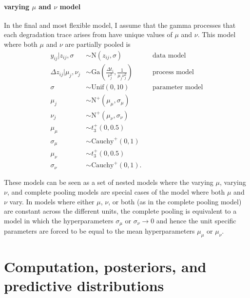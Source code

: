 \paragraph{varying $\mu$ and $\nu$ model} In the final and most flexible model, I assume that the gamma processes that each degradation trace arises from have unique values of $\mu$ and $\nu$. This model where both $\mu$ and $\nu$ are partially pooled is
\begin{align*} 
   y_{ij}|z_{ij}, \sigma & \sim \mbox{N}(z_{ij}, \sigma)  && \mbox{data model} \\
   \Delta z_{ij}|\mu_j, \nu_j & \sim \mbox{Ga} \left( \frac{\Delta t_{i}}{\nu_j^2}, \frac{1}{\mu_j \nu_j^2} \right) && \mbox{process model} \\
   \sigma & \sim \mbox{Unif}(0, 10) && \mbox{parameter model} \\
   \mu_j & \sim \mbox{N}^{+}(\mu_{\mu}, \sigma_{\mu}) \\
   \nu_j & \sim \mbox{N}^{+}(\mu_{\nu}, \sigma_{\nu}) \\
   \mu_{\mu} & \sim t^{+}_3(0, 0.5) \\
   \sigma_{\mu} & \sim \mbox{Cauchy}^{+}(0, 1) \\
   \mu_{\nu} & \sim t^{+}_3(0, 0.5) \\
   \sigma_{\nu} & \sim \mbox{Cauchy}^{+}(0, 1).
\end{align*}

These models can be seen as a set of nested models where the varying $\mu$, varying $\nu$, and complete pooling models are special cases of the model where both $\mu$ and $\nu$ vary. In models where either $\mu$, $\nu$, or both (as in the complete pooling model) are constant across the different units, the complete pooling is equivalent to a model in which the hyperparameters $\sigma_\mu$ or $\sigma_\nu \longrightarrow 0$ and hence the unit specific parameters are forced to be equal to the mean hyperparameters $\mu_\mu$ or $\mu_\nu$.

\section{Computation, posteriors, and predictive distributions} \label{sec:unit-to-unit-sampling}

